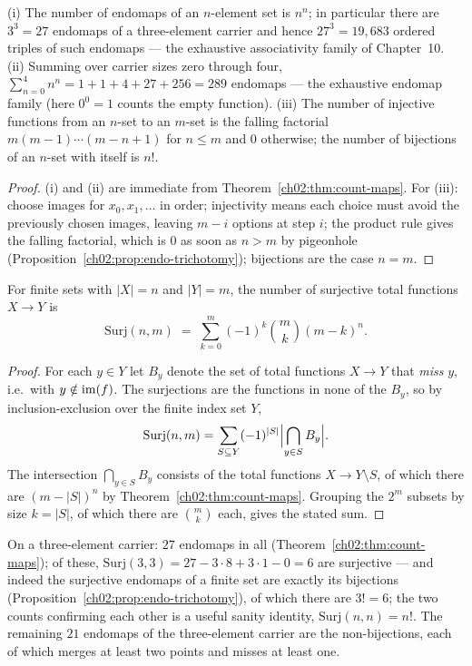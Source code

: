 \begin{corollary}\label{ch02:cor:test-counts}
(i) The number of endomaps of an $n$-element set is $n^n$; in particular
there are $3^3 = 27$ endomaps of a three-element carrier and hence
$27^3 = 19{,}683$ ordered triples of such endomaps --- the exhaustive
associativity family of Chapter~10. (ii) Summing over carrier sizes zero
through four, $\sum_{n=0}^{4} n^n = 1 + 1 + 4 + 27 + 256 = 289$ endomaps
--- the exhaustive endomap family (here $0^0 = 1$ counts the empty
function). (iii) The number of injective functions from an $n$-set to an
$m$-set is the falling factorial $m (m-1) \cdots (m-n+1)$ for
$n \leq m$ and $0$ otherwise; the number of bijections of an $n$-set with
itself is $n!$.
\end{corollary}

\begin{proof}
(i) and (ii) are immediate from Theorem~\ref{ch02:thm:count-maps}. For
(iii): choose images for $x_0, x_1, \dots$ in order; injectivity means each
choice must avoid the previously chosen images, leaving $m - i$ options at
step $i$; the product rule gives the falling factorial, which is $0$ as
soon as $n > m$ by pigeonhole
(Proposition~\ref{ch02:prop:endo-trichotomy}); bijections are the case
$n = m$.
\end{proof}

\begin{theorem}\label{ch02:thm:count-surj}
For finite sets with $|X| = n$ and $|Y| = m$, the number of surjective
total functions $X \to Y$ is
\[
\mathrm{Surj}(n, m) \;=\; \sum_{k=0}^{m} (-1)^{k} \binom{m}{k}
(m - k)^{n}.
\]
\end{theorem}

\begin{proof}
For each $y \in Y$ let $B_y$ denote the set of total functions
$X \to Y$ that \emph{miss} $y$, i.e.\ with $y \notin \mathrm{im}(f)$. The
surjections are the functions in none of the $B_y$, so by
inclusion-exclusion over the finite index set $Y$,
\[
\mathrm{Surj}(n, m)
= \sum_{S \subseteq Y} (-1)^{|S|} \Bigl| \bigcap_{y \in S} B_y \Bigr|.
\]
The intersection $\bigcap_{y \in S} B_y$ consists of the total functions
$X \to Y \setminus S$, of which there are $(m - |S|)^{n}$ by
Theorem~\ref{ch02:thm:count-maps}. Grouping the $2^m$ subsets by size
$k = |S|$, of which there are $\binom{m}{k}$ each, gives the stated sum.
\end{proof}

\begin{example}\label{ch02:ex:count-small}
On a three-element carrier: $27$ endomaps in all
(Theorem~\ref{ch02:thm:count-maps}); of these,
$\mathrm{Surj}(3,3) = 27 - 3 \cdot 8 + 3 \cdot 1 - 0 = 6$ are surjective
--- and indeed the surjective endomaps of a finite set are exactly its
bijections (Proposition~\ref{ch02:prop:endo-trichotomy}), of which there
are $3! = 6$; the two counts confirming each other is a useful sanity
identity, $\mathrm{Surj}(n,n) = n!$. The remaining $21$ endomaps of the
three-element carrier are the non-bijections, each of which merges at
least two points and misses at least one.
\end{example}

